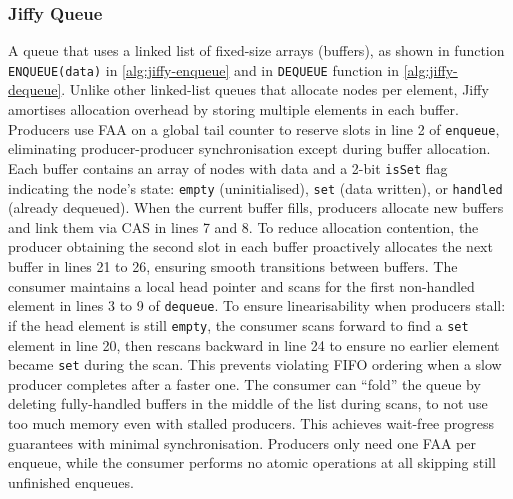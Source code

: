 \subsubsection{Jiffy Queue}\label{subsubsec:jiffy-mpsc-queue}
A queue that uses a linked list of fixed-size arrays (buffers), as shown in function \newline \texttt{ENQUEUE(data)} in \cref{alg:jiffy-enqueue} and in \texttt{DEQUEUE} function in \cref{alg:jiffy-dequeue}. Unlike other linked-list queues that allocate nodes per element, Jiffy amortises allocation overhead by storing multiple elements in each buffer. Producers use \ac{FAA} on a global tail counter to reserve slots in line 2 of \texttt{enqueue}, eliminating producer-producer synchronisation except during buffer allocation. Each buffer contains an array of nodes with data and a 2-bit \texttt{isSet} flag indicating the node's state: \texttt{empty} (uninitialised), \texttt{set} (data written), or \texttt{handled} (already dequeued). When the current buffer fills, producers allocate new buffers and link them via \ac{CAS} in lines 7 and 8. To reduce allocation contention, the producer obtaining the second slot in each buffer proactively allocates the next buffer in lines 21 to 26, ensuring smooth transitions between buffers. The consumer maintains a local head pointer and scans for the first non-handled element in lines 3 to 9 of \texttt{dequeue}. To ensure linearisability when producers stall: if the head element is still \texttt{empty}, the consumer scans forward to find a \texttt{set} element in line 20, then rescans backward in line 24 to ensure no earlier element became \texttt{set} during the scan. This prevents violating FIFO ordering when a slow producer completes after a faster one. The consumer can ``fold'' the queue by deleting fully-handled buffers in the middle of the list during scans, to not use too much memory even with stalled producers. This achieves wait-free progress guarantees with minimal synchronisation. Producers only need one \ac{FAA} per enqueue, while the consumer performs no atomic operations at all skipping still unfinished enqueues. \cite{jiffy}


